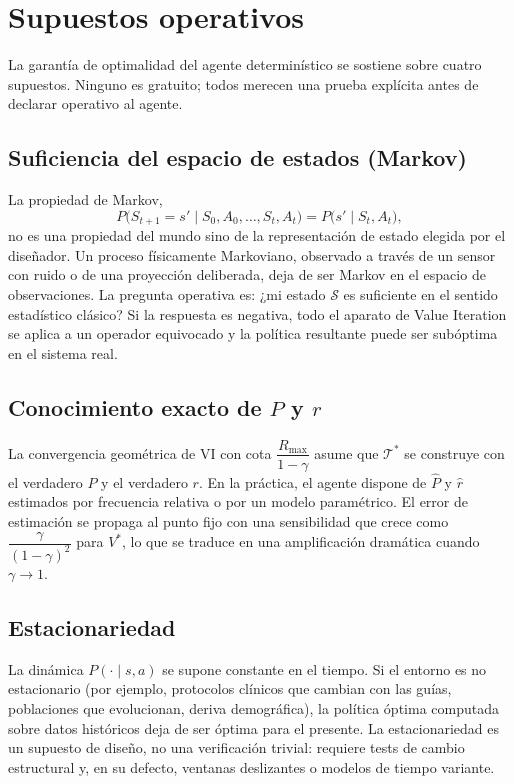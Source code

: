 \documentclass[12pt, a4paper]{article}
\theoremstyle{plain}
\theoremstyle{definition}
\newcommand{\cT}{\mathcal{T}}
\newcommand{\cS}{\mathcal{S}}
\newcommand{\Vopt}{V^{*}}
\newcommand{\Phat}{\widehat{P}}
\newcommand{\rhat}{\widehat{r}}
\begin{document}
\section{Supuestos operativos}
\label{sec:supuestos}

La garantía de optimalidad del agente determinístico se sostiene sobre
cuatro supuestos. Ninguno es gratuito; todos merecen una prueba
explícita antes de declarar operativo al agente.

\subsection{Suficiencia del espacio de estados (Markov)}

La propiedad de Markov,
\[
  P\bigl(S_{t+1}=s'\mid S_0,A_0,\dots,S_t,A_t\bigr)
  =P\bigl(s'\mid S_t,A_t\bigr),
\]
no es una propiedad del mundo sino de la representación de estado elegida
por el diseñador. Un proceso físicamente Markoviano, observado a través
de un sensor con ruido o de una proyección deliberada, deja de ser
Markov en el espacio de observaciones. La pregunta operativa es: ¿mi
estado $\cS$ es suficiente en el sentido estadístico clásico? Si la
respuesta es negativa, todo el aparato de Value Iteration se aplica a un
operador equivocado y la política resultante puede ser subóptima en el
sistema real.

\subsection{Conocimiento exacto de $P$ y $r$}

La convergencia geométrica de VI con cota $\dfrac{R_{\max}}{1-\gamma}$
asume que $\cT^{*}$ se construye con el verdadero $P$ y el verdadero
$r$. En la práctica, el agente dispone de $\Phat$ y $\rhat$ estimados
por frecuencia relativa o por un modelo paramétrico. El error de
estimación se propaga al punto fijo con una sensibilidad que crece como
$\dfrac{\gamma}{(1-\gamma)^2}$ para $\Vopt$, lo que se traduce en una
amplificación dramática cuando $\gamma\to 1$.

\subsection{Estacionariedad}

La dinámica $P(\cdot\mid s,a)$ se supone constante en el tiempo. Si el
entorno es no estacionario (por ejemplo, protocolos clínicos que cambian
con las guías, poblaciones que evolucionan, deriva demográfica), la
política óptima computada sobre datos históricos deja de ser óptima para
el presente. La estacionariedad es un supuesto de diseño, no una
verificación trivial: requiere tests de cambio estructural y, en su
defecto, ventanas deslizantes o modelos de tiempo variante.
\end{document}
